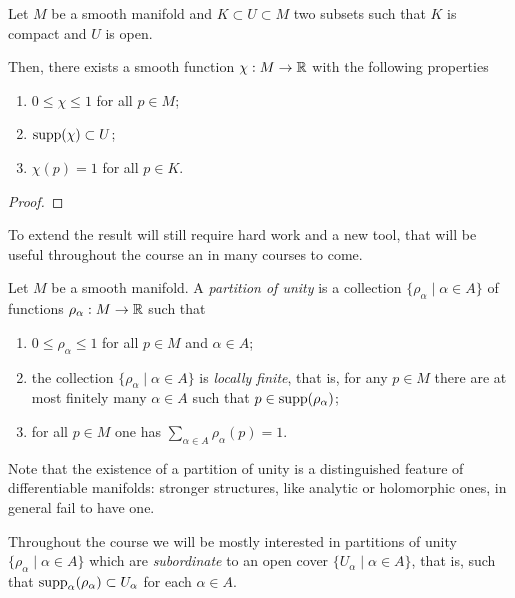 \begin{lem}
  Let $M$ be a smooth manifold and $K\subset U\subset M$ two subsets such that $K$ is compact and $U$ is open.
  
  Then, there exists a smooth function $\chi: M \to\mathbb{R}$ with the following properties
  \begin{enumerate}
    \item $0 \leq \chi \leq 1$ for all $p\in M$;
    \item $\operatorname{supp}(\chi)\subset U$;
    \item $\chi(p) = 1$ for all $p\in K$.
  \end{enumerate}
\end{lem}
\begin{proof}
\end{proof}

To extend the result will still require hard work and a new tool, that will be useful throughout the course an in many courses to come.

\begin{defn}
  Let $M$ be a smooth manifold. A \emph{partition of unity} is a collection $\{\rho_\alpha \mid \alpha\in A\}$ of functions $\rho_\alpha:M\to\mathbb{R}$ such that
  \begin{enumerate}
    \item $0 \leq \rho_\alpha \leq 1$ for all $p\in M$ and $\alpha\in A$;
    \item\label{def:pou.2} the collection $\{\rho_\alpha \mid \alpha\in A\}$ is \emph{locally finite}, that is, for any $p\in M$ there are at most finitely many $\alpha\in A$ such that $p\in\operatorname{supp}(\rho_\alpha)$;
    \item for all $p\in M$ one has $\sum_{\alpha\in A} \rho_\alpha(p) = 1$.
  \end{enumerate}
\end{defn}

Note that the existence of a partition of unity is a distinguished feature of differentiable manifolds: stronger structures, like analytic or holomorphic ones, in general fail to have one.

Throughout the course we will be mostly interested in partitions of unity $\{\rho_\alpha \mid \alpha\in A\}$ which are \emph{subordinate} to an open cover $\{U_\alpha\mid\alpha\in A\}$, that is, such that $\operatorname{supp}_\alpha(\rho_\alpha) \subset U_\alpha$ for each $\alpha\in A$.

